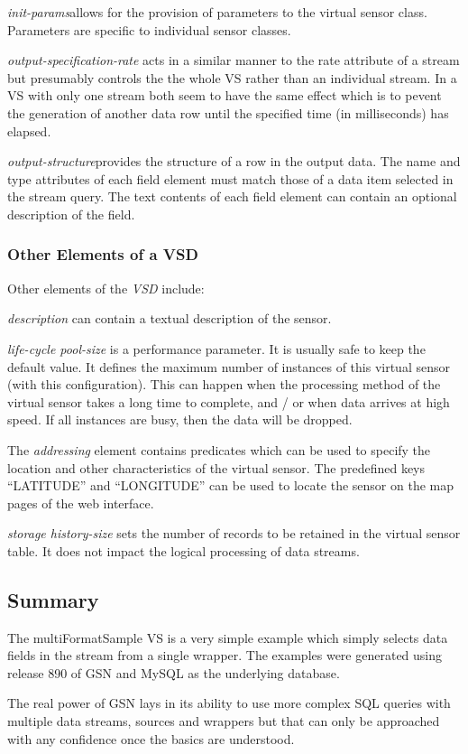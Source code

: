 \textit{init-params}\hspace{15pt}allows for the provision of
parameters to the virtual sensor class.  Parameters are specific to
individual sensor classes.

\textit{output-specification-rate} acts in a similar manner to the
rate attribute of a stream but presumably controls the the whole VS
rather than an individual stream.  In a VS with only one stream both
seem to have the same effect which is to pevent the generation of
another data row until the specified time (in milliseconds) has
elapsed.

\textit{output-structure}\hspace{15pt}provides the structure of a row
in the output data.  The name and type attributes of each field element
must match those of a data item selected in the stream query.  The text
contents of each field element can contain an optional description of
the field.

\subsubsection{Other Elements of a VSD}

Other elements of the \textit{VSD} include:

\textit{description }can contain a textual description of the sensor.

\textit{life-cycle pool-size }is a performance parameter.  It is
usually safe to keep the default value.  It defines the maximum number
of instances of this virtual sensor (with this configuration). This can
happen when the processing method of the virtual sensor takes a long
time to complete, and / or when data arrives at high speed. If all
instances are busy, then the data will be dropped.

The \textit{addressing} element contains predicates which can be used
to specify the location and other characteristics of the virtual
sensor.  The predefined keys
\textquotedblleft{}LATITUDE\textquotedblright{} and
\textquotedblleft{}LONGITUDE\textquotedblright{} can be used to locate
the sensor on the map pages of the web interface.

\textit{storage history-size} sets the number of records to be
retained in the virtual sensor table.  It does not impact the logical
processing of data streams.

\subsection{Summary}

The multiFormatSample VS is a very simple example which simply selects
data fields in the stream from a single wrapper.  The examples were
generated using release 890 of GSN and MySQL as the underlying
database.

The real power of GSN lays in its ability to use more complex SQL
queries with multiple data streams, sources and wrappers but that can
only be approached with any confidence once the basics are understood.

